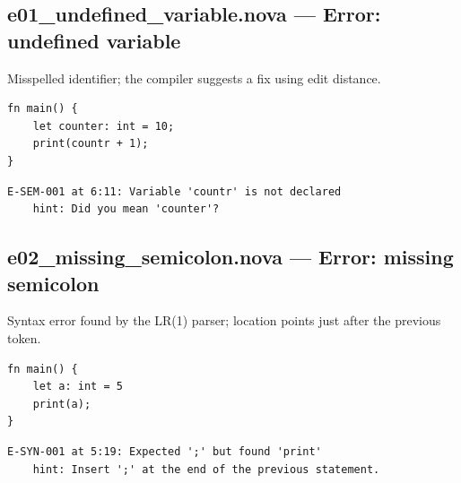 \subsection*{e01\_undefined\_variable.nova --- Error: undefined variable}
\noindent Misspelled identifier; the compiler suggests a fix using edit distance.
\begin{lstlisting}[language=nova,]
fn main() {
    let counter: int = 10;
    print(countr + 1);
}
\end{lstlisting}
\begin{tcolorbox}[colback=red!4,colframe=red!60!black,title={Compiler output},fonttitle=\bfseries\small,boxsep=2pt,left=4pt,right=4pt,top=2pt,bottom=2pt]
\begin{lstlisting}[basicstyle=\ttfamily\scriptsize,frame=none,backgroundcolor=\color{white}]
E-SEM-001 at 6:11: Variable 'countr' is not declared
    hint: Did you mean 'counter'?
\end{lstlisting}
\end{tcolorbox}
\subsection*{e02\_missing\_semicolon.nova --- Error: missing semicolon}
\noindent Syntax error found by the LR(1) parser; location points just after the previous token.
\begin{lstlisting}[language=nova,]
fn main() {
    let a: int = 5
    print(a);
}
\end{lstlisting}
\begin{tcolorbox}[colback=red!4,colframe=red!60!black,title={Compiler output},fonttitle=\bfseries\small,boxsep=2pt,left=4pt,right=4pt,top=2pt,bottom=2pt]
\begin{lstlisting}[basicstyle=\ttfamily\scriptsize,frame=none,backgroundcolor=\color{white}]
E-SYN-001 at 5:19: Expected ';' but found 'print'
    hint: Insert ';' at the end of the previous statement.
\end{lstlisting}
\end{tcolorbox}
